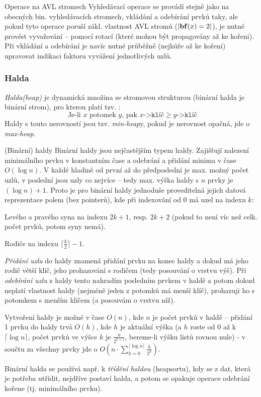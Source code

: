 \begin{algoritmusN}{Operace na AVL stromech}
Vyhledávací operace se provádí stejně jako na obecných bin. vyhledávacích stromech, vkládání a odebírání prvků taky, ale pokud tyto operace poruší zákl. vlastnost AVL stromů ($|\mathbf{bf}(x)=2|$), je nutné provést vyvažování -- pomocí rotací (které mohou být propagovány až ke kořeni). Při vkládání a odebírání je navíc nutné průběžně (nejhůře až ke kořeni) upravovat indikaci faktoru vyvážení jednotlivých uzlů.
\end{algoritmusN}

\subsubsection*{Halda}

\begin{definice}
\emph{Halda(heap)} je dynamická množina se stromovou strukturou (binární halda je binární strom), pro kterou platí tzv. : $$\text{ Je-li }x\text{ potomek }y\text{, pak }x\texttt{->klíč}\geq y\texttt{->klíč}$$ Haldy s touto nerovností jsou tzv. \emph{min-heap}y, pokud je nerovnost opačná, jde o \emph{max-heap}.
\end{definice}

\begin{obecne}{(Binární) haldy}
Binární haldy jsou nejčastějším typem haldy. Zajišťují nalezení minimálního prvku v konstantním čase a odebrání a přidání minima v čase $O(\log n)$. V každé hladině od první až do předposlední je max. možný počet uzlů, v poslední jsou uzly co nejvíce  -- tedy max. výška haldy s $n$ prvky je $(\log n) + 1$. Proto je pro binární haldy jednoduše proveditelná jejich datová reprezentace polem (bez pointerů), kde při indexování od 0 má uzel na indexu $k$:
\begin{pitemize}
    \item Levého a pravého syna na indexu $2k+1$, resp. $2k+2$ (pokud to není víc než celk. počet prvků, potom syny nemá).
    \item Rodiče na indexu $\lceil\frac{k}{2}\rceil-1$. 
\end{pitemize}

\emph{Přidání uzlu} do haldy znamená přidání prvku na konec haldy a dokud má jeho rodič větší klíč, jeho prohazování s rodičem (tedy posouvání o vrstvu výš). Při \emph{odebírání uzlu} z haldy tento nahradím posledním prvkem v haldě a potom dokud neplatí vlastnost haldy (nejméně jeden z potomků má menší klíč), prohazuji ho s potomkem s menším klíčem (a posouvám o vrstvu níž).

Vytvoření haldy je možné v čase $O(n)$, kde $n$ je počet prvků v haldě -- přidání 1 prvku do haldy trvá $O(h)$, kde $h$ je aktuální výška (a $h$ roste od $0$ až k $\lceil\log n\rceil$, počet prvků ve výšce $k$ je $\frac{n}{2^{k+1}}$, bereme-li výšku listů rovnou nule) - v součtu za všechny prvky jde o $O(n\cdot\sum_{h=0}^{\lceil\log n\rceil}\frac{h}{2^h})$.

Binární halda se používá např. k \emph{třídění haldou} (heapsortu), kdy se z dat, která je potřeba utřídit, nejdříve postaví halda, a potom se opakuje operace odebrání kořene (tj. minimálního prvku).
\end{obecne}

